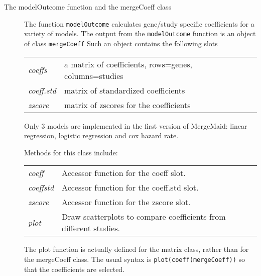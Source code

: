 \documentclass[12pt]{article}
\begin{document}
\begin{description}
\item[The modelOutcome function and the mergeCoeff class] The function \verb+modelOutcome+ calculates gene/study  specific coefficients for a variety of models.  The output from the \verb+modelOutcome+ function is an object of class \verb+mergeCoeff+  Such an object contains the following slots

\begin{center}
  \begin{tabular}{|lp{5in}|}
    \hline
    {\it coeffs} & a matrix of coefficients, rows=genes, columns=studies\\
    {\it coeff.std} & matrix of standardized coefficients \\
 {\it zscore} & matrix of zscores for the coefficients \\ \hline
  \end{tabular}
\end{center}

Only 3 models are implemented in the first version of MergeMaid:
linear regression, logistic regression and cox hazard rate.

Methods for this class include:
\begin{center}
  \begin{tabular}{|lp{5in}|}
    \hline
{\it coeff} &Accessor function for the coeff slot. \\
{\it coeffstd} &Accessor function for the coeff.std slot. \\
{\it zscore} &Accessor function for the zscore slot. \\
   {\it plot} &Draw scatterplots to compare coefficients from different studies.\\  \hline

 \end{tabular}
\end{center}

The plot function is actually defined for the matrix class, rather
than for the mergeCoeff class.  The usual syntax is
\verb+plot(coeff(mergeCoeff))+ so that the coefficients are
selected.
\end{description}
\end{document}
